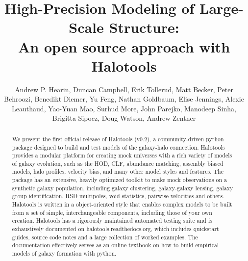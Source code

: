 \documentclass[twocolumn, tighten]{aastex6}
\begin{document}
\title{High-Precision Modeling of Large-Scale Structure: \\An open source approach with Halotools}

\author{Andrew P. Hearin, Duncan Campbell, Erik Tollerud,
Matt Becker, Peter Behroozi, Benedikt Diemer, Yu Feng, 
Nathan Goldbaum, Elise Jennings, Alexie Leauthaud, Yao-Yuan Mao, 
Surhud More, John Parejko, Manodeep Sinha, Brigitta Sipocz, 
Doug Watson, Andrew Zentner 
}


\begin{abstract}

We  present the first official release of Halotools (v0.2), a community-driven python package designed to build and test models of the galaxy-halo connection. Halotools provides a modular platform for creating mock universes with a rich variety of models of galaxy evolution, such as the HOD, CLF, abundance matching, assembly biased models, halo profiles, velocity bias, and many other model styles and features. The package has an extensive, heavily optimized toolkit to make mock observations on a synthetic galaxy population, including galaxy clustering, galaxy-galaxy lensing, galaxy group identification, RSD multipoles, void statistics, pairwise velocities and others. Halotools is written in a object-oriented style that enables complex models to be built from a set of simple, interchangeable components, including those of your own creation. Halotools has a rigorously maintained automated testing suite and is exhaustively documented on halotools.readthedocs.org, which includes quickstart guides, source code notes and a large collection of worked examples. The documentation effectively serves as an online textbook on how to build empirical models of galaxy formation with python. 
\end{abstract} 
\end{document}
